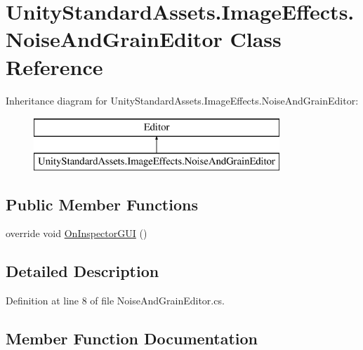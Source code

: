 \hypertarget{class_unity_standard_assets_1_1_image_effects_1_1_noise_and_grain_editor}{}\section{Unity\+Standard\+Assets.\+Image\+Effects.\+Noise\+And\+Grain\+Editor Class Reference}
\label{class_unity_standard_assets_1_1_image_effects_1_1_noise_and_grain_editor}
Inheritance diagram for Unity\+Standard\+Assets.\+Image\+Effects.\+Noise\+And\+Grain\+Editor\+:\begin{figure}[H]
\begin{center}
\leavevmode
\includegraphics[height=2.000000cm]{class_unity_standard_assets_1_1_image_effects_1_1_noise_and_grain_editor}
\end{center}
\end{figure}
\subsection*{Public Member Functions}
\begin{DoxyCompactItemize}
\item 
override void \mbox{\hyperlink{class_unity_standard_assets_1_1_image_effects_1_1_noise_and_grain_editor_a15946fccd74478bd7bc2bcc46dedaecc}{On\+Inspector\+G\+UI}} ()
\end{DoxyCompactItemize}


\subsection{Detailed Description}


Definition at line 8 of file Noise\+And\+Grain\+Editor.\+cs.



\subsection{Member Function Documentation}
\mbox{\label{class_unity_standard_assets_1_1_image_effects_1_1_noise_and_grain_editor_a15946fccd74478bd7bc2bcc46dedaecc}} 
